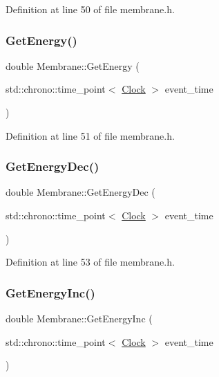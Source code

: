 Definition at line 50 of file membrane.\+h.

\mbox{\label{class_membrane_a50d39c596daa7af8da7dd7215d3a32ba}} 
\subsubsection{\texorpdfstring{Get\+Energy()}{GetEnergy()}}
{\footnotesize\ttfamily double Membrane\+::\+Get\+Energy (\begin{DoxyParamCaption}\item[{std\+::chrono\+::time\+\_\+point$<$ \mbox{\hyperlink{universe_8h_a0ef8d951d1ca5ab3cfaf7ab4c7a6fd80}{Clock}} $>$}]{event\+\_\+time }\end{DoxyParamCaption})\hspace{0.3cm}{\ttfamily [inline]}}



Definition at line 51 of file membrane.\+h.

\mbox{\label{class_membrane_a874068c028004d4dde7ec41d999872eb}} 
\subsubsection{\texorpdfstring{Get\+Energy\+Dec()}{GetEnergyDec()}}
{\footnotesize\ttfamily double Membrane\+::\+Get\+Energy\+Dec (\begin{DoxyParamCaption}\item[{std\+::chrono\+::time\+\_\+point$<$ \mbox{\hyperlink{universe_8h_a0ef8d951d1ca5ab3cfaf7ab4c7a6fd80}{Clock}} $>$}]{event\+\_\+time }\end{DoxyParamCaption})\hspace{0.3cm}{\ttfamily [inline]}}



Definition at line 53 of file membrane.\+h.

\mbox{\label{class_membrane_a00e038f0023186139467d490c6cd38a3}} 
\subsubsection{\texorpdfstring{Get\+Energy\+Inc()}{GetEnergyInc()}}
{\footnotesize\ttfamily double Membrane\+::\+Get\+Energy\+Inc (\begin{DoxyParamCaption}\item[{std\+::chrono\+::time\+\_\+point$<$ \mbox{\hyperlink{universe_8h_a0ef8d951d1ca5ab3cfaf7ab4c7a6fd80}{Clock}} $>$}]{event\+\_\+time }\end{DoxyParamCaption})\hspace{0.3cm}{\ttfamily [inline]}}



